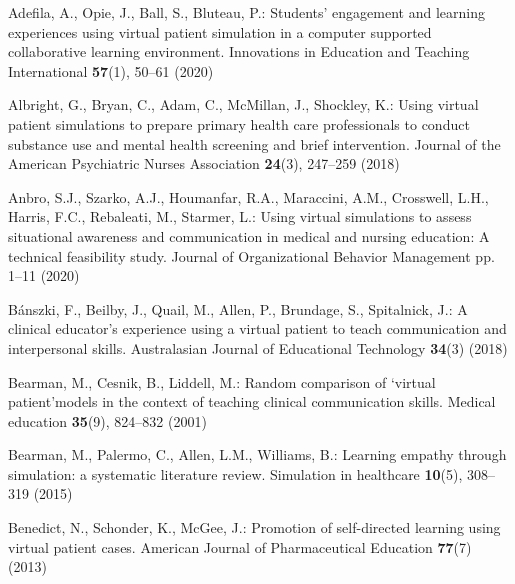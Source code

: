 \documentclass[runningheads]{llncs}
\begin{document}
%
%
%
\begin{thebibliography}{10}
\providecommand{\url}[1]{\texttt{#1}}
\providecommand{\urlprefix}{URL }
\providecommand{\doi}[1]{https://doi.org/#1}

Adefila, A., Opie, J., Ball, S., Bluteau, P.: Students’ engagement and
  learning experiences using virtual patient simulation in a computer supported
  collaborative learning environment. Innovations in Education and Teaching
  International  \textbf{57}(1),  50--61 (2020)

Albright, G., Bryan, C., Adam, C., McMillan, J., Shockley, K.: Using virtual
  patient simulations to prepare primary health care professionals to conduct
  substance use and mental health screening and brief intervention. Journal of
  the American Psychiatric Nurses Association  \textbf{24}(3),  247--259 (2018)

Anbro, S.J., Szarko, A.J., Houmanfar, R.A., Maraccini, A.M., Crosswell, L.H.,
  Harris, F.C., Rebaleati, M., Starmer, L.: Using virtual simulations to assess
  situational awareness and communication in medical and nursing education: A
  technical feasibility study. Journal of Organizational Behavior Management
  pp. 1--11 (2020)

B{\'a}nszki, F., Beilby, J., Quail, M., Allen, P., Brundage, S., Spitalnick,
  J.: A clinical educator’s experience using a virtual patient to teach
  communication and interpersonal skills. Australasian Journal of Educational
  Technology  \textbf{34}(3) (2018)

Bearman, M., Cesnik, B., Liddell, M.: Random comparison of ‘virtual
  patient’models in the context of teaching clinical communication skills.
  Medical education  \textbf{35}(9),  824--832 (2001)

Bearman, M., Palermo, C., Allen, L.M., Williams, B.: Learning empathy through
  simulation: a systematic literature review. Simulation in healthcare
  \textbf{10}(5),  308--319 (2015)

Benedict, N., Schonder, K., McGee, J.: Promotion of self-directed learning
  using virtual patient cases. American Journal of Pharmaceutical Education
  \textbf{77}(7) (2013)


\end{thebibliography}
\end{document}
